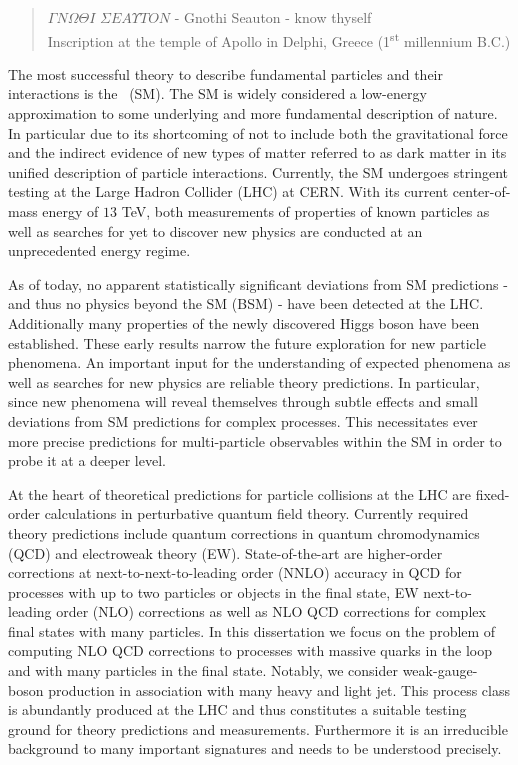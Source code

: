 \begin{quote}
$\Gamma N \Omega \Theta I$ $\Sigma E A \Upsilon T
O N$ - Gnothi Seauton - know thyself\\
Inscription at the temple of Apollo in Delphi, Greece
(1\textsuperscript{st} millennium B.C.)
\end{quote}



The most successful theory to describe fundamental particles and their interactions is the
\SM~(SM). The SM is widely considered a low-energy approximation to some underlying and
more fundamental description of nature. In particular due to its shortcoming
of not to include both the gravitational force and the indirect evidence of new types of matter referred to as dark matter in its unified description
of particle interactions. Currently, the SM undergoes stringent testing at the Large Hadron Collider (LHC) at CERN. With its current center-of-mass energy of $13$ TeV, both measurements
of properties of known particles as well as searches for yet to
discover new physics are conducted at an unprecedented
energy regime. 

As of today, no apparent statistically significant deviations from SM predictions - and thus no physics beyond the SM (BSM) - have been detected at the LHC. Additionally many
properties of the newly discovered Higgs boson have been established. These early results narrow
the future exploration
for new particle phenomena. An
important input for the
understanding of
expected phenomena as well as searches for new physics are
reliable theory predictions. In particular, since new
phenomena will reveal themselves through subtle effects and small
deviations from SM predictions for complex processes. This necessitates ever more precise
predictions for multi-particle observables within the SM in order to probe it at a
deeper level.



At the heart of theoretical predictions for particle collisions at
the LHC are fixed-order calculations in perturbative quantum field theory. Currently required theory predictions include quantum corrections in quantum chromodynamics (QCD) and electroweak theory (EW). State-of-the-art are higher-order
corrections at next-to-next-to-leading order (NNLO)
accuracy in QCD for processes with up to two
particles or objects in the final state, EW next-to-leading order
(NLO) corrections as well as
NLO QCD corrections for complex final states with many particles. In
this dissertation we focus on the problem of
computing NLO QCD corrections to processes with massive quarks in the
loop and with many particles in the final state. Notably,
we consider weak-gauge-boson production in association with
many heavy and light jet. This process class is abundantly produced at the LHC and thus constitutes a suitable testing ground for theory predictions and measurements. Furthermore it is an irreducible background to many important signatures and needs to be understood precisely.




